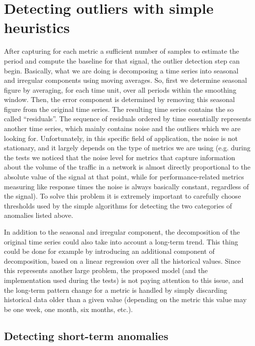 \documentclass[12pt,a4paper,cucitura]{toptesi}
\begin{document}
\section{Detecting outliers with simple heuristics}

After capturing for each metric a sufficient number of samples to estimate the period and compute the baseline for that signal, the outlier detection step can begin.
Basically, what we are doing is decomposing a time series into seasonal and irregular components using moving averages.
So, first we determine seasonal figure by averaging, for each time unit, over all periods within the smoothing window. 
Then, the error component is determined by removing this seasonal figure from the original time series.
The resulting time series contains the so called ``residuals''. 
The sequence of residuals ordered by time essentially represents another time series, which mainly contains noise and the outliers which we are looking for.
Unfortunately, in this specific field of application, the noise is not stationary, and it largely depends on the type of metrics we are using (e.g.  during the tests we noticed that the noise level for metrics that capture information about the volume of the traffic in a network is almost directly proportional to the absolute value of the signal at that point, while for performance-related metrics measuring like response times the noise is always basically constant, regardless of the signal).
To solve this problem it is extremely important to carefully choose thresholds used by the simple algorithms for detecting the two categories of anomalies listed above.


In addition to the seasonal and irregular component, the decomposition of the original time series could also take into account a long-term trend.
This thing could be done for example by introducing an additional component of decomposition, based on a linear regression over all the historical values.
Since this represents another large problem, the proposed model (and the implementation used during the tests) is not paying attention to this issue, and the long-term pattern change for a metric is handled by simply discarding historical data older than a given value (depending on the metric this value may be one week, one month, six months, etc.).

\subsection{Detecting short-term anomalies}
\end{document}

